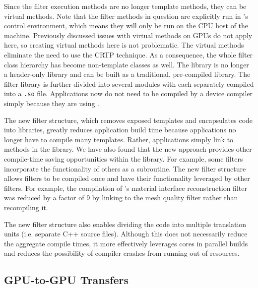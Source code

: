 Since the filter execution methods are no longer template methods, they can be virtual methods.
Note that the filter methods in question are explicitly run in \vtkm's control environment, which means they will only be run on the CPU host of the machine.
Previously discussed issues with virtual methods on GPUs do not apply here, so creating virtual methods here is not problematic.
The virtual methods eliminate the need to use the CRTP technique.
As a consequence, the whole filter class hierarchy has become non-template classes as well.
The library is no longer a header-only library and can be built as a traditional, pre-compiled library.
The filter library is further divided into several modules with each separately compiled into a \texttt{.so} file.
Applications now do not need to be compiled by a device compiler simply because they are using \vtkm.

The new filter structure, which removes exposed templates and encapsulates code into libraries, greatly reduces application build time because applications no longer have to compile many \vtkm templates.
Rather, applications simply link to methods in the \vtkm library.
We have also found that the new approach provides other compile-time saving opportunities within the library.
For example, some filters incorporate the functionality of others as a subroutine.
The new filter structure allows filters to be compiled once and have their functionality leveraged by other filters.
For example, the compilation of \vtkm's material interface reconstruction filter was reduced by a factor of 9 by linking to the mesh quality filter rather than recompiling it.

The new filter structure also enables dividing the code into multiple translation units (i.e. separate C++ source files).
Although this does not necessarily reduce the aggregate compile times, it more effectively leverages cores in parallel builds and reduces the possibility of compiler crashes from running out of resources.

\subsection{GPU-to-GPU Transfers}

